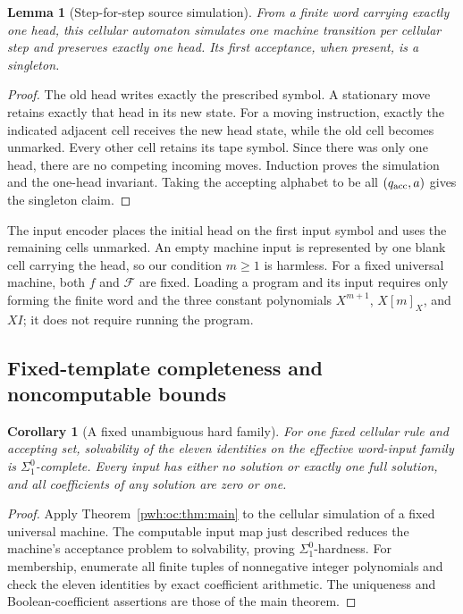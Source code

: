 \documentclass[11pt,letterpaper]{article}
\numberwithin{equation}{section}
\newtheorem{lemma}[theorem]{Lemma}
\newtheorem{corollary}[theorem]{Corollary}
\theoremstyle{definition}
\newcommand{\F}{\mathcal F}
\newcommand{\rep}[1]{[#1]_X}
\begin{document}
\begin{lemma}[Step-for-step source simulation]
\label{pwh:oc:lem:tmca}
From a finite word carrying exactly one head, this cellular automaton
simulates one machine transition per cellular step and preserves exactly
one head. Its first acceptance, when present, is a singleton.
\end{lemma}

\begin{proof}
The old head writes exactly the prescribed symbol. A stationary move
retains exactly that head in its new state. For a moving instruction,
exactly the indicated adjacent cell receives the new head state, while
the old cell becomes unmarked. Every other cell retains its tape symbol.
Since there was only one head, there are no competing incoming moves.
Induction proves the simulation and the one-head invariant. Taking the
accepting alphabet to be all $(q_{\rm acc},a)$ gives the singleton claim.
\end{proof}

The input encoder places the initial head on the first input symbol and
uses the remaining cells unmarked. An empty machine input is represented
by one blank cell carrying the head, so our condition $m\ge1$ is harmless.
For a fixed universal machine, both $f$ and $\F$ are fixed. Loading a
program and its input requires only forming the finite word and the three
constant polynomials $X^{m+1}$, $X\rep m$, and $XI$; it does not require
running the program.

\subsection{Fixed-template completeness and noncomputable bounds}

\begin{corollary}[A fixed unambiguous hard family]
\label{pwh:oc:cor:hard}
For one fixed cellular rule and accepting set, solvability of the eleven
identities on the effective word-input family is $\Sigma^0_1$-complete.
Every input has either no solution or exactly one full solution, and all
coefficients of any solution are zero or one.
\end{corollary}

\begin{proof}
Apply Theorem~\ref{pwh:oc:thm:main} to the cellular simulation of a fixed
universal machine. The computable input map just described reduces the
machine's acceptance problem to solvability, proving
$\Sigma^0_1$-hardness. For membership, enumerate all finite tuples of
nonnegative integer polynomials and check the eleven identities by exact
coefficient arithmetic. The uniqueness and Boolean-coefficient assertions
are those of the main theorem.
\end{proof}
\end{document}
